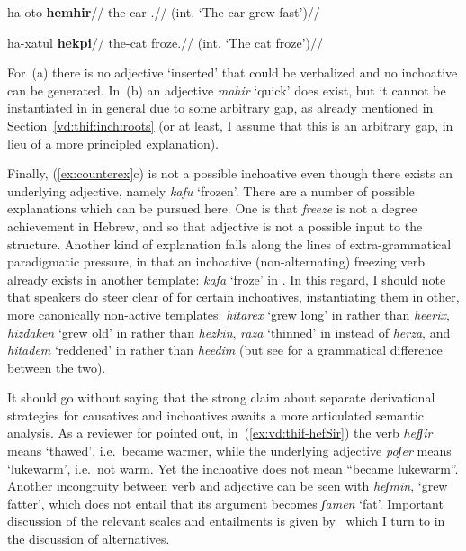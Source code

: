 	\a \ljudge{*}
		\begingl
		\gla ha-oto \textbf{hemhir}//
		\glb the-car .//
		\glft (int. `The car grew fast')//
	\endgl

	\a \ljudge{*}
		\begingl
		\gla ha-xatul \textbf{hekpi}//
		\glb the-cat froze.//
		\glft (int. `The cat froze')//
	\endgl
\xe

For~(\lastx a) there is no adjective `inserted' that could be verbalized and no inchoative can be generated. In~(\lastx b) an adjective \emph{mahir} `quick' does exist, but it cannot be instantiated in {\thif} in general due to some arbitrary gap, as already mentioned in Section~\ref{vd:thif:inch:roots} (or at least, I assume that this is an arbitrary gap, in lieu of a more principled explanation).

Finally, (\ref{ex:counterex}c) is not a possible inchoative even though there exists an underlying adjective, namely \emph{kafu} `frozen'. There are a number of possible explanations which can be pursued here. One is that \emph{freeze} is not a degree achievement in Hebrew, and so that adjective is not a possible input to the structure. Another kind of explanation falls along the lines of extra-grammatical paradigmatic pressure, in that an inchoative (non-alternating) freezing verb already exists in another template: \emph{kafa} `froze' in {\tkal}. In this regard, I should note that speakers do steer clear of {\thif} for certain inchoatives, instantiating them in other, more canonically non-active templates: \emph{hitarex} `grew long' in {\thit} rather than \emph{heerix}, \emph{hizdaken} `grew old' in {\thit} rather than \emph{hezkin}, \emph{raza} `thinned' in {\tkal} instead of \emph{herza}, and \emph{hitadem} `reddened' in {\thit} rather than \emph{heedim} (but see \citealt[22]{doron03} for a grammatical difference between the two).

It should go without saying that the strong claim about separate derivational strategies for causatives and inchoatives awaits a more articulated semantic analysis. As a reviewer for \cite{kastner19tlr} pointed out, in~(\ref{ex:vd:thif-hefSir}) the verb \emph{hefʃir} means `thawed', i.e.~became warmer, while the underlying adjective \emph{poʃer} means `lukewarm', i.e.~not warm. Yet the inchoative does not mean ``became lukewarm''. Another incongruity between verb and adjective can be seen with \emph{heʃmin}, `grew fatter', which does not entail that its argument becomes \emph{ʃamen} `fat'. Important discussion of the relevant scales and entailments is given by~\cite{borer91} which I turn to in the discussion of alternatives.

